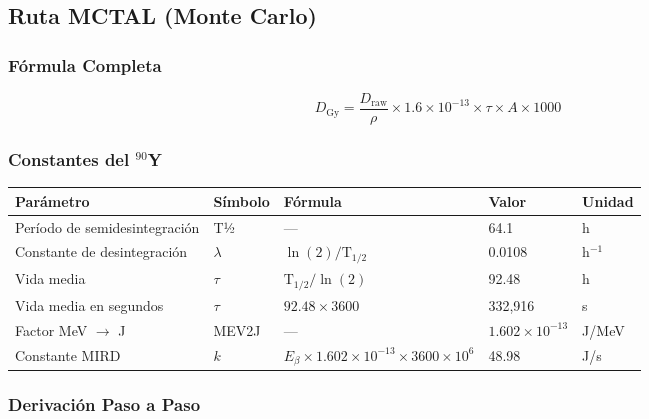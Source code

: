 \documentclass[12pt,a4paper]{article}
\begin{document}
\subsection{Ruta MCTAL (Monte Carlo)}

\subsubsection{Fórmula Completa}

$$D_{\text{Gy}} = \frac{D_{\text{raw}}}{\rho} \times 1.6\times10^{-13} \times \tau \times A \times 1000$$


\subsubsection{Constantes del $^{90}$Y}

\begin{tabular}{p{4cm} p{2cm} p{4cm} p{2.5cm} p{2cm}}
\toprule
\textbf{Parámetro} & \textbf{Símbolo} & \textbf{Fórmula} & \textbf{Valor} & \textbf{Unidad} \\
\midrule
Período de semidesintegración & T½ & --- & 64.1 & h \\
Constante de desintegración & $\lambda$ & $\ln(2)/\text{T}_{1/2}$ & 0.0108 & h$^{-1}$ \\
Vida media & $\tau$ & $\text{T}_{1/2}/\ln(2)$ & 92.48 & h \\
Vida media en segundos & $\tau$ & $92.48 \times 3600$ & 332,916 & s \\
Factor MeV $\to$ J & MEV2J & --- & $1.602\times10^{-13}$ & J/MeV \\
Constante MIRD & $k$ & $E_{\beta} \times 1.602\times10^{-13} \times 3600 \times 10^6$ & 48.98 & J/s \\
\bottomrule
\end{tabular}

\subsubsection{Derivación Paso a Paso}
\end{document}

